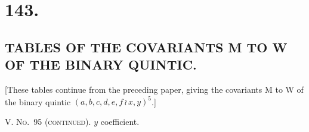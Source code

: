 \documentclass[11pt,a4paper]{article}
\begin{document}
\setlength{\parindent}{1.5em}
\setlength{\parskip}{0pt plus 1pt}


\clearpage
\section*{143.}
\subsection*{TABLES OF THE COVARIANTS M TO W OF THE BINARY QUINTIC.}

[These tables continue from the preceding paper, giving the covariants M to W
of the binary quintic $(a, b, c, d, e, f \, \wr\, x, y)^5$.]

\bigskip
\noindent\textsc{V. No.~95 (continued).} $y$ coefficient.
\end{document}
